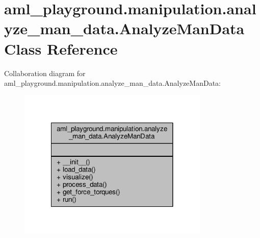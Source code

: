 \hypertarget{classaml__playground_1_1manipulation_1_1analyze__man__data_1_1_analyze_man_data}{\section{aml\-\_\-playground.\-manipulation.\-analyze\-\_\-man\-\_\-data.\-Analyze\-Man\-Data Class Reference}
\label{classaml__playground_1_1manipulation_1_1analyze__man__data_1_1_analyze_man_data}
}


Collaboration diagram for aml\-\_\-playground.\-manipulation.\-analyze\-\_\-man\-\_\-data.\-Analyze\-Man\-Data\-:
\nopagebreak
\begin{figure}[H]
\begin{center}
\leavevmode
\includegraphics[width=258pt]{classaml__playground_1_1manipulation_1_1analyze__man__data_1_1_analyze_man_data__coll__graph}
\end{center}
\end{figure}
